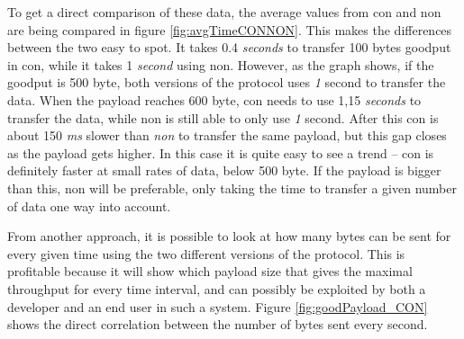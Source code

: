 
\noindent To get a direct comparison of these data, the average values from \gls{con} and \gls{non} are being compared in figure \ref{fig:avgTimeCONNON}. This makes the differences between the two easy to spot. It takes 0.4 \textit{seconds} to transfer 100 bytes \gls{goodput} in \gls{con}, while it takes 1 \textit{second} using \gls{non}. However, as the graph shows, if the goodput is 500 byte, both versions of the protocol uses \textit{1} second to transfer the data. When the \gls{payload} reaches 600 byte, \gls{con} needs to use 1,15 \textit{seconds} to transfer the data, while \gls{non} is still able to only use \textit{1} second. After this \gls{con} is about 150 \textit{ms} slower than \textit{non} to transfer the same payload, but this gap closes as the payload gets higher. In this case it is quite easy to see a trend -- \gls{con} is definitely faster at small rates of data, below 500 byte. If the payload is bigger than this, \gls{non} will be preferable, only taking the time to transfer a given number of data one way into account.





\noindent From another approach, it is possible to look at how many bytes can be sent for every given time using the two different versions of the protocol. This is profitable because it will show which payload size that gives the maximal \gls{throughput} for every time interval, and can possibly be exploited by both a developer and an end user in such a system. Figure \ref{fig:goodPayload_CON} shows the direct correlation between the number of bytes sent every second. 

